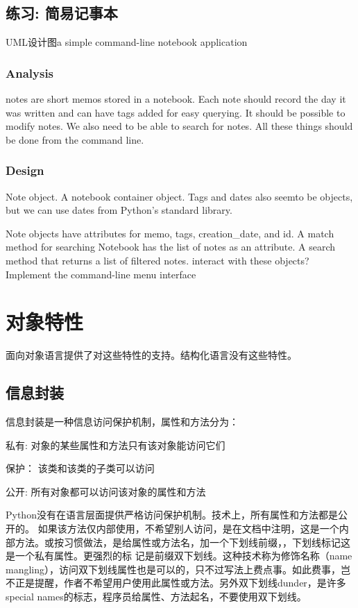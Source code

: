 \subsection{练习: 简易记事本}
UML设计图a simple command-line notebook application
\subsubsection{Analysis}
notes are short memos stored in a notebook.  Each note should record
the day it was written and can have tags added for easy querying.  It
should be possible to modify notes.  We also need to be able to search
for notes.  All these things should be done from the command line.
\subsubsection{Design}

Note object.  A notebook container object.  Tags and dates also seemto
be objects, but we can use dates from Python's standard library.

Note objects have attributes for memo, tags, creation\_date, and id.  A
match method for searching Notebook has the list of notes as an
attribute.  A search method that returns a list of filtered notes.
interact with these objects? Implement the command-line menu interface

\section{对象特性}
面向对象语言提供了对这些特性的支持。结构化语言没有这些特性。
\subsection{信息封装}
信息封装是一种信息访问保护机制，属性和方法分为：
\begin{description}
\item{私有:} 对象的某些属性和方法只有该对象能访问它们
\item{保护：} 该类和该类的子类可以访问
\item{公开:} 所有对象都可以访问该对象的属性和方法
\end{description}
Python没有在语言层面提供严格访问保护机制。技术上，所有属性和方法都是公开的。 如果该方法仅内部使用，不希望别人访问，是在文档中注明，这是一个内部方法。或按习惯做法，是给属性或方法名，加一个下划线前缀，，下划线标记这是一个私有属性。更强烈的标
记是前缀双下划线。这种技术称为修饰名称（name mangling），访问双下划线属性也是可以的，只不过写法上费点事。如此费事，岂不正是提醒，作者不希望用户使用此属性或方法。另外双下划线dunder，是许多special names的标志，程序员给属性、方法起名，不要使用双下划线。
